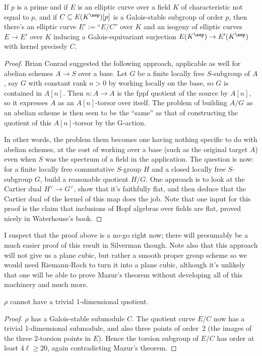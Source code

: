 \begin{theorem}\label{Elliptic_curve_quotient_by_finite_subgroup}\notready If $p$ is a prime and
  if $E$ is an elliptic curve over a field $K$ of characteristic not equal to $p$,
   and if $C\subseteq E(K^{\sep})[p]$ is a Galois-stable
  subgroup of order $p$, then there's an elliptic curve $E':=$``$E/C$'' over $K$ and an isogeny of elliptic 
  curves $E\to E'$ over $K$ inducing a Galois-equivariant surjection $E(K^{\sep})\to E'(K^{\sep})$ 
  with kernel precisely $C$.
\end{theorem}
\begin{proof}
  Brian Conrad suggested the following approach, applicable as well for abelian schemes $A\to S$ 
  over a base.  Let $G$ be a finite locally free $S$-subgroup of $A$, say $G$ with constant 
  rank $n > 0$ by working locally on the base, so $G$ is contained in $A[n]$.  Then 
  $n: A \to A$ is the fppf quotient of the source by $A[n]$, so it expresses $A$ as an 
  $A[n]$-torsor over itself.  The problem of building $A/G$ as an abelian scheme is then 
  seen to be the “same” as that of constructing the quotient of this $A[n]$-torsor by the G-action.

  In other words, the problem them becomes one having nothing specific to do with abelian schemes, 
  at the cost of working over a base (such as the original target $A$) even when $S$ was the 
  spectrum of a field in the application. The question is now: for a finite locally free 
  commutative $S$-group $H$ and a closed locally free $S$-subgroup $G$, build a reasonable quotient 
  $H/G$. One approach is to look at the Cartier dual $H^\vee\to G^\vee$, show that it's faithfully 
  flat, and then deduce that the Cartier dual of the kernel of this map does the job. Note that 
  one input for this proof is the claim that inclusions of Hopf algebras over fields are flat, 
  proved nicely in Waterhouse’s book.
\end{proof}

I suspect that the proof above is a no-go right now; there will presumably be a much easier proof of this result in Silverman though. Note also that this approach will not
give us a plane cubic, but rather a smooth proper group scheme so we would need Riemann-Roch
to turn it into a plane cubic, although it's unlikely that one will be able to prove Mazur's
theorem without developing all of this machinery and much more.

\begin{corollary}\label{Frey_curve_no_trivial_quotient} $\rho$ cannot have a trivial 1-dimensional quotient.
\end{corollary}
\begin{proof} $\rho$ has a Galois-stable submodule $C$. The quotient curve $E/C$ now has
  a trivial 1-dimensional submodule, and also three points of order~2 (the images of the three
  2-torsion points in $E$). Hence the torsion subgroup of $E/C$ has order at least $4\ell\geq 20$, 
  again contradicting Mazur's theorem.
\end{proof}

